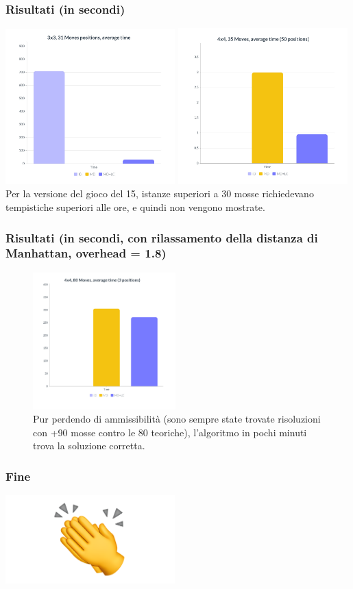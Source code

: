 \documentclass[11pt]{beamer}
\begin{document}
\begin{frame}
\frametitle{Risultati (in secondi)}
\includegraphics[width=0.49\textwidth]{3331.jpg}
\includegraphics[width=0.49\textwidth]{4435.jpg}
Per la versione del gioco del 15, istanze superiori a 30 mosse richiedevano tempistiche superiori alle ore, e quindi non vengono mostrate.
\centering
\end{frame}


\begin{frame}
\frametitle{Risultati (in secondi, con rilassamento della distanza di Manhattan, overhead = 1.8)}
\begin{figure}
    \centering
    \includegraphics[width=0.49\textwidth]{relax.jpg}
    \caption{Pur perdendo di ammissibilità (sono sempre state trovate risoluzioni con +90 mosse contro le 80 teoriche), l'algoritmo in 
    pochi minuti trova la soluzione corretta.}
  \end{figure}

\centering
\end{frame}

\begin{frame}
\frametitle{Fine}
\includegraphics[width=0.49\textwidth]{clapping.png}
\centering
\end{frame}
\end{document}

